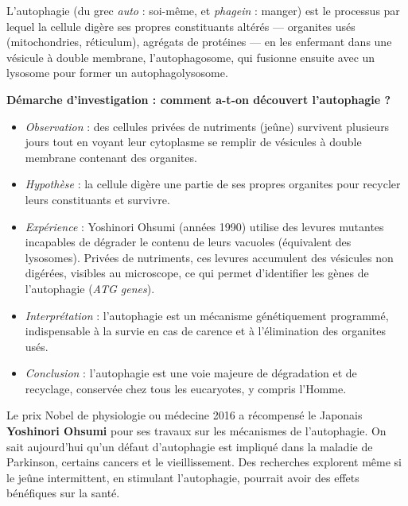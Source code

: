 \documentclass[11pt]{article}
\newcommand{\cle}[1]{{\popxbold\color{popdark}#1}}
\begin{document}
\begin{definition}
L'\cle{autophagie} (du grec \emph{auto} : soi-même, et \emph{phagein} : manger) est le processus par lequel la cellule digère ses propres constituants altérés — organites usés (mitochondries, réticulum), agrégats de protéines — en les enfermant dans une vésicule à double membrane, l'\cle{autophagosome}, qui fusionne ensuite avec un lysosome pour former un \cle{autophagolysosome}.
\end{definition}

\textbf{Démarche d'investigation : comment a-t-on découvert l'autophagie ?}
\begin{itemize}
\item \emph{Observation} : des cellules privées de nutriments (jeûne) survivent plusieurs jours tout en voyant leur cytoplasme se remplir de vésicules à double membrane contenant des organites.
\item \emph{Hypothèse} : la cellule digère une partie de ses propres organites pour recycler leurs constituants et survivre.
\item \emph{Expérience} : Yoshinori Ohsumi (années 1990) utilise des levures mutantes incapables de dégrader le contenu de leurs vacuoles (équivalent des lysosomes). Privées de nutriments, ces levures accumulent des vésicules non digérées, visibles au microscope, ce qui permet d'identifier les gènes de l'autophagie (\emph{ATG genes}).
\item \emph{Interprétation} : l'autophagie est un mécanisme génétiquement programmé, indispensable à la survie en cas de carence et à l'élimination des organites usés.
\item \emph{Conclusion} : l'autophagie est une voie majeure de dégradation et de recyclage, conservée chez tous les eucaryotes, y compris l'Homme.
\end{itemize}

\begin{savaistu}
Le prix Nobel de physiologie ou médecine 2016 a récompensé le Japonais \textbf{Yoshinori Ohsumi} pour ses travaux sur les mécanismes de l'autophagie. On sait aujourd'hui qu'un défaut d'autophagie est impliqué dans la maladie de Parkinson, certains cancers et le vieillissement. Des recherches explorent même si le jeûne intermittent, en stimulant l'autophagie, pourrait avoir des effets bénéfiques sur la santé.
\end{savaistu}
\end{document}
